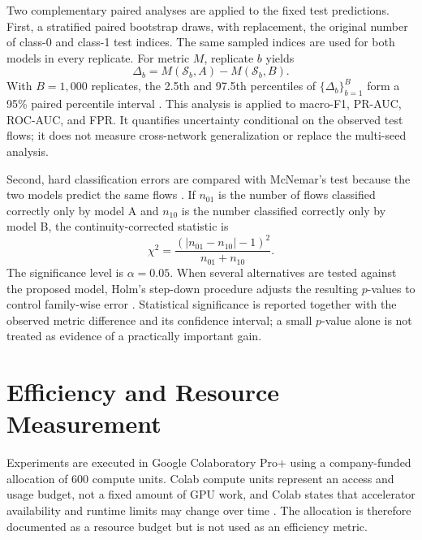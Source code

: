 Two complementary paired analyses are applied to the fixed test predictions.
First, a stratified paired bootstrap draws, with replacement, the original
number of class-0 and class-1 test indices. The same sampled indices are used
for both models in every replicate. For metric $M$, replicate $b$ yields
\begin{equation}
    \Delta_b=M(\mathcal{S}_b,A)-M(\mathcal{S}_b,B).
    \label{eq:paired_bootstrap_difference}
\end{equation}
With $B=1{,}000$ replicates, the 2.5th and 97.5th percentiles of
$\{\Delta_b\}_{b=1}^{B}$ form a 95\% paired percentile interval
\cite{EfronTibshirani1993Bootstrap}. This analysis is applied to macro-F1,
PR-AUC, ROC-AUC, and FPR. It quantifies uncertainty conditional on the observed
test flows; it does not measure cross-network generalization or replace the
multi-seed analysis.

Second, hard classification errors are compared with McNemar's test because
the two models predict the same flows \cite{McNemar1947}. If $n_{01}$ is the
number of flows classified correctly only by model A and $n_{10}$ is the
number classified correctly only by model B, the continuity-corrected statistic
is
\begin{equation}
    \chi^2=\frac{\left(|n_{01}-n_{10}|-1\right)^2}
    {n_{01}+n_{10}}.
    \label{eq:mcnemar_statistic}
\end{equation}
The significance level is $\alpha=0.05$. When several alternatives are tested
against the proposed model, Holm's step-down procedure adjusts the resulting
$p$-values to control family-wise error \cite{Holm1979}. Statistical
significance is reported together with the observed metric difference and its
confidence interval; a small $p$-value alone is not treated as evidence of a
practically important gain.

\section{Efficiency and Resource Measurement}
\label{subsec:efficiency_protocol}

Experiments are executed in Google Colaboratory Pro+ using a company-funded
allocation of 600 compute units. Colab compute units represent an access and
usage budget, not a fixed amount of GPU work, and Colab states that accelerator
availability and runtime limits may change over time
\cite{GoogleColabFAQ2026}. The allocation is therefore documented as a resource
budget but is not used as an efficiency metric.

